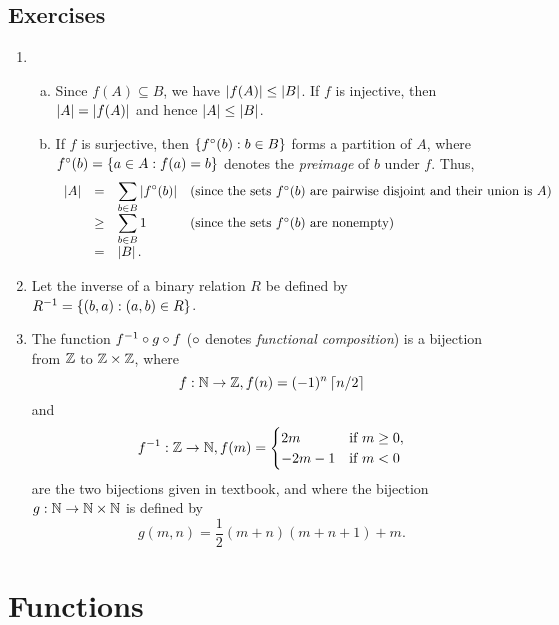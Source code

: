 \subsection*{Exercises}
\begin{enumerate}[\thesection-1]
%
\item
\begin{enumerate}[(a)]
\item Since $f(A) \subseteq B$, we have $\left|f(A)\right| \leq \left|B\right|$. If $f$ is injective, then $\left|A\right| = \left|f(A)\right|$ and hence $\left|A\right| \leq \left|B\right|$.
\item If $f$ is surjective, then $\left\{f^\circ(b) : b \in B\right\}$ forms a partition of $A$, where $f^\circ(b) = \left\{a \in A : f(a) = b\right\}$ denotes the \emph{preimage} of $b$ under $f$. Thus,
\[
\begin{array}{llll}
\card{A} & =    & \ds{\sum\limits_{b \in B} \card{f^\circ(b)}} & \mathtext{(since the sets \mathmode{f^\circ(b)} are pairwise disjoint and their union is \mathmode{A})} \cr
         & \geq & \ds{\sum\limits_{b \in B} 1} & \mathtext{(since the sets \mathmode{f^\circ(b)} are nonempty)} \cr
         & =    & \card{B}. & \cr
\end{array}
\]
\end{enumerate}
%
\setcounter{enumi}{2}
%
\item Let the inverse of a binary relation $R$ be defined by $R^{-1} = \left\{(b, a) : (a, b) \in R\right\}$.
%
\item The function $f^{-1} \mathbin{\circ} g \mathbin{\circ} f$ ($\mathbin{\circ}$ denotes \emph{functional composition}) is a bijection from $\mathbb{Z}$ to $\mathbb{Z} \times \mathbb{Z}$, where
\[
f: \mathbb{N} \to \mathbb{Z}, f(n) = (-1)^n \left\lceil n/2\right\rceil
\]
and
\[
\inv{f}: \zah \to \nat, f(m) =
\begin{cases}
2m      & \mathtext{if \mathmode{m \geq 0}}, \cr
-2m - 1 & \mathtext{if \mathmode{m < 0}} \cr
\end{cases}
\]
are the two bijections given in textbook, and where the bijection $g : \mathbb{N} \to \mathbb{N} \times \mathbb{N}$ is defined by
\[
g(m, n) = \frac{1}{2}(m + n)(m + n + 1) + m.
\]
%
\end{enumerate}

\section{Functions}

